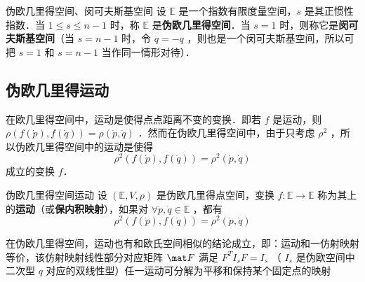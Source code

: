 \begin{definition}{伪欧几里得空间、闵可夫斯基空间}
设 $\mathbb E$ 是一个指数有限度量空间，$s$ 是其正惯性指数．当 $1\leq s\leq n-1$ 时，称 $\mathbb E$ 是\textbf{伪欧几里得空间}．当 $s=1$ 时，则称它是\textbf{闵可夫斯基空间}（当 $s=n-1$ 时，令 $q=-q$ ，则也是一个闵可夫斯基空间，所以可把 $s=1$ 和 $s=n-1$ 当作同一情形对待）．
\end{definition}
\subsection{伪欧几里得运动}
在欧几里得空间中，运动是使得点点距离不变的变换．即若 $f$ 是运动，则 $\rho(f(\dot p),f(\dot q))=\rho(\dot p,\dot q)$ ．然而在伪欧几里得空间中，由于只考虑 $\rho^2$ ，所以伪欧几里得空间中的运动是使得
\begin{equation}
\rho^2(f(\dot p),f(\dot q))=\rho^2(\dot p,\dot q)
\end{equation}
成立的变换 $f$．
\begin{definition}{伪欧几里得空间运动}
设 $(\mathbb E,V,\rho)$ 是伪欧几里得点空间，变换 $f:\mathbb E\rightarrow\mathbb E$ 称为其上的\textbf{运动}（或\textbf{保内积映射}），如果对 $\forall \dot p,\dot q\in\mathbb E$ ，都有
\begin{equation}
\rho^2(f(\dot p),f(\dot q))=\rho^2(\dot p,\dot q)
\end{equation}
\end{definition}
在伪欧几里得空间，运动也有和欧氏空间相似的结论成立，即：运动和一仿射映射等价，该仿射映射线性部分对应矩阵 $\mat F$ 满足 $F^TI_sF=I_s$ （ $I_s$ 是伪欧空间中二次型 $q$ 对应的双线性型）任一运动可分解为平移和保持某个固定点的映射